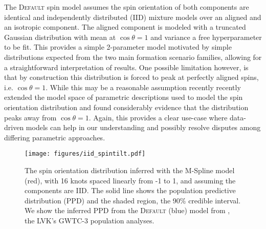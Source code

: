 The \textsc{Default} spin model assumes the spin orientation of both components are identical and independently distributed (IID) mixture models over an
aligned and an isotropic component. The aligned component is modeled with a truncated Gaussian distribution with mean at $\cos{\theta}=1$ and variance a free 
hyperparameter to be fit. This provides a simple 2-parameter model motivated by simple distributions expected from the two main formation scenario families, allowing 
for a straightforward interpretation of results. One possible limitation however, is that by construction this distribution is forced to peak at perfectly aligned spins, 
i.e. $\cos{\theta}=1$. While this may be a reasonable assumption recently \citet{spinitasyoulike} recently extended the model space of parametric descriptions 
used to model the spin orientation distribution and found considerably evidence that the distribution peaks away from $\cos{\theta}=1$. Again, this provides a clear 
use-case where data-driven models can help in our understanding and possibly resolve disputes among differing parametric approaches.

\begin{figure}
    \begin{centering}
        \texttt{[image: figures/iid\_spintilt.pdf]}
        \caption{The spin orientation distribution inferred with the M-Spline model (red), with 16 knots spaced linearly from -1 to 1, and 
        assuming the components are IID. The solid line shows the population predictive distribution (PPD) and the shaded region, the 90\% credible interval. 
        We show the inferred PPD from the \textsc{Default} (blue) model from \citet{o3b_astro_dist}, the LVK's GWTC-3 population analyses.}
        \label{fig:iid_spintilt_dist}
    \end{centering}
\end{figure}

